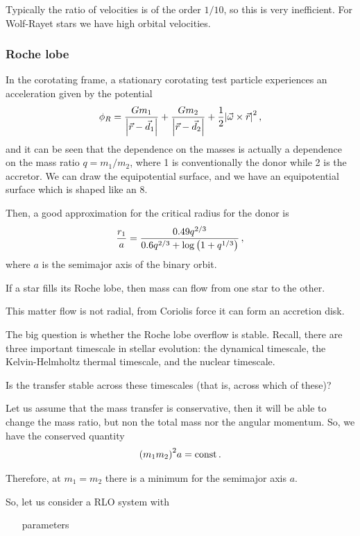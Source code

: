 \documentclass[main.tex]{subfiles}
\begin{document}
Typically the ratio of velocities is of the order \(1/10\), so this is very inefficient. 
For Wolf-Rayet stars we have high orbital velocities. 

\subsubsection{Roche lobe}

In the corotating frame, a stationary corotating test particle experiences an acceleration given by the potential 
%
\begin{align}
\phi_R = \frac{G m_1}{\abs{\vec{r} - \vec{d}_1}} + \frac{G m_2}{\abs{\vec{r} - \vec{d}_{2}}} + \frac{1}{2} \abs{\vec{\omega} \times \vec{r}}^2
\,,
\end{align}
%
and it can be seen that the dependence on the masses is actually a dependence on the mass ratio \(q = m_1 / m_2\), where 1 is conventionally the donor while 2 is the accretor. 
We can draw the equipotential surface, and we have an equipotential surface which is shaped like an 8. 

Then, a good approximation for the critical radius for the donor is
%
\begin{align}
\frac{r_1}{a} = \frac{\num{.49} q^{2/3}}{\num{.6} q^{2/3} + \log \qty(1 + q^{1/3})}
\,,
\end{align}
%
where \(a\) is the semimajor axis of the binary orbit. 

If a star fills its Roche lobe, then mass can flow from one star to the other. 

This matter flow is not radial, from Coriolis force it can form an accretion disk. 

The big question is whether the Roche lobe overflow is stable.
Recall, there are three important timescale in stellar evolution: the dynamical timescale, the Kelvin-Helmholtz thermal timescale, and the nuclear timescale. 

Is the transfer stable across these timescales (that is, across which of these)? 

Let us assume that the mass transfer is conservative, then it will be able to change the mass ratio, but non the total mass nor the angular momentum. So, we have the conserved quantity 
%
\begin{align}
\qty(m_1 m_2 )^2 a = \text{const}
\,.
\end{align}

Therefore, at \(m_1 = m_2 \) there is a minimum for the semimajor axis \(a\).

So, let us consider a RLO system with 
\begin{enumerate}
  \item [parameters]
\end{enumerate}
\end{document}
